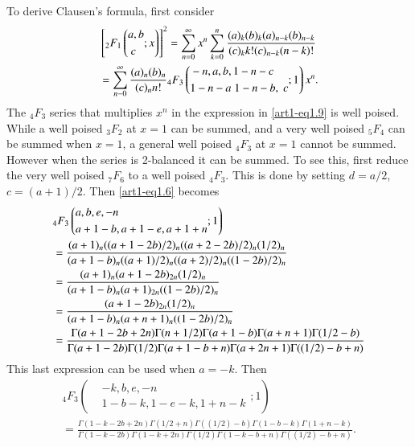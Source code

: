To derive Clausen's formula, first consider
\begin{align}
&\left[{}_2 F_1 \left(
\begin{aligned}
& a, b\\
& ~ c
\end{aligned}; x\right) \right]^2 = \sum\limits^\infty_{n=0} x^n \sum\limits^n_{k=0} \frac{(a)_k (b)_k (a)_{n-k} (b)_{n-k}}{(c)_k k! (c)_{n-k} (n-k)!}
\label{art1-eq1.9}\\
& =\sum\limits^\infty_{n-0} \frac{(a)_n (b)_n}{(c)_n n!} {}_4 F_3
\left(\begin{aligned}
&-n, a, b, 1 - n - c \\
& 1 - n - a \; 1 - n - b , \; c
\end{aligned}; 1
 \right) x^n. \notag
\end{align}\pageoriginale 
The ${}_4 F_3$ series that multiplies $x^n$ in the expression in \eqref{art1-eq1.9} is well poised. While a well poised ${}_3 F_2$ at $x =1$ can be summed, and a very well poised ${}_5 F_4$ can be summed when $x =1$, a general well poised ${}_4 F_3$ at $x =1$ cannot be summed. However when the series is 2-balanced it can be summed. To see this, first reduce the very well poised ${}_7 F_6$ to a well poised ${}_4 F_3$. This is done by setting $d = a /2$, $c= (a+1)/2$. Then \eqref{art1-eq1.6} becomes 
\begin{align}
&{}_4 F_3 \left(
\begin{aligned}
&a, b, e, -n\\
& a+1 - b, a+1-e, a + 1 + n
\end{aligned};1
 \right)
\label{art1-eq1.10}\\
& = \frac{(a+1)_n ((a+1-2b)/2)_n ((a+2-2b)/2)_n (1/2)_n}{(a+1-b)_n ((a+1)/2)_n ((a+2)/2)_n ((1-2b)/2)_n}\notag\\
& = \frac{(a+1)_n (a+1-2b)_{2n} (1/2)_n}{(a+1-b)_n (a+1)_{2n} ((1-2b)/2)_n}\notag\\
& = \frac{(a+1-2b)_{2n} (1/2)_n}{(a+1-b)_n (a+n+1)_n ((1-2b)/2)_n}\notag\\
& = \frac{\Gamma (a+1-2b+2n)\Gamma (n+1/2) \Gamma (a+1-b) \Gamma (a+n+1) \Gamma( 1/2-b)}{\Gamma (a+1-2b)\Gamma (1/2) \Gamma (a+1-b + n) \Gamma (a+2 n + 1) \Gamma ((1/2) - b + n)} \notag
\end{align}
This last expression can be used when $a= -k$. Then
\begin{gather*}
{}_4 F_3 \left(\begin{aligned}& -k, b, e, -n\\ &1- b-k, 1 -e-k, 1 + n - k \end{aligned} ; 1\right)\\
 = \frac{\Gamma (1-k - 2 b + 2 n ) \Gamma (1/2 + n)  \Gamma ((1/2)-b) \Gamma (1-b-k) \Gamma (1+ n -k)}{\Gamma (1-k - 2 b) \Gamma (1-k + 2n) \Gamma (1/2) \Gamma (1-k-b + n) \Gamma ((1/2) - b + n)} .
\end{gather*}
